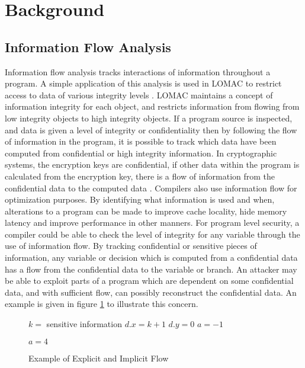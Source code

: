 \section{Background}
\subsection{Information Flow Analysis}
Information flow analysis tracks interactions of information throughout a
program. A simple application of this analysis is used in LOMAC to restrict
access to data of various integrity levels \cite{fraser2000lomac}. LOMAC
maintains a concept of information integrity for each object, and restricts
information from flowing from low integrity objects to high integrity objects.
If a program source is inspected, and data is given a level of integrity or
confidentiality then by following the flow of information in the program, it is
possible to track which data have been computed from confidential or high
integrity information. In cryptographic systems, the encryption keys are
confidential, if other data within the program is calculated from the encryption
key, there is a flow of information from the confidential data to the computed
data \cite{wang2017cached}. Compilers also use information flow for optimization
purposes. By identifying what information is used and when, alterations to a
program can be made to improve cache locality, hide memory latency and improve
performance in other manners. For program level security, a compiler could be
able to check the level of integrity for any variable through the use of
information flow. By tracking confidential or sensitive pieces of information,
any variable or decision which is computed from a confidential data has a flow
from the confidential data to the variable or branch. An attacker may be able to
exploit parts of a program which are dependent on some confidential data, and
with sufficient flow, can possibly reconstruct the confidential data. An example
is given in figure \ref{alg:simpleflow} to illustrate this concern.

\begin{figure}
  \hrulefill
  \begin{algorithmic}
    \State $k =$ sensitive information
    \State $d.x =  k + 1$
    \State $d.y = 0$
    \State $a = -1$

      \State $a = 4$
    \EndIf

  \end{algorithmic}
  \hrulefill
  \caption{Example of Explicit and Implicit Flow}
  \label{alg:simpleflow}
\end{figure}

